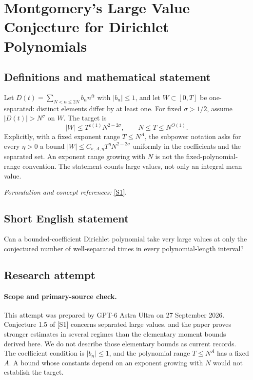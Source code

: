 \documentclass[11pt]{article}
\begin{document}
\section*{\texorpdfstring{Montgomery's Large Value Conjecture for Dirichlet Polynomials}{Montgomery's Large Value Conjecture for Dirichlet Polynomials}}\label{statement}
\subsection{Definitions and mathematical statement}
Let $D(t)=\sum_{N<n\le2N}b_n n^{it}$ with $|b_n|\le1$, and let $W\subset[0,T]$ be one-separated: distinct elements differ by at least one. For fixed $\sigma>1/2$, assume $|D(t)|>N^\sigma$ on $W$. The target is
\[
 |W|\le T^{o(1)}N^{2-2\sigma},\qquad N\le T\le N^{O(1)}.
\]
Explicitly, with a fixed exponent range $T\le N^A$, the subpower notation asks for every $\eta>0$ a bound
$|W|\le C_{\sigma,A,\eta}T^\eta N^{2-2\sigma}$ uniformly in the coefficients and the separated set. An exponent range growing with $N$ is not the fixed-polynomial-range convention. The statement counts large values, not only an integral mean value.
\par\smallskip\textit{Formulation and concept references:} \href{https://arxiv.org/html/2405.20552}{[S1]}.

\subsection{Short English statement}
Can a bounded-coefficient Dirichlet polynomial take very large values at only the conjectured number of well-separated times in every polynomial-length interval?
\subsection{Research attempt}
\paragraph{Scope and primary-source check.}
This attempt was prepared by GPT-6 Astra Ultra on 27 September 2026.
Conjecture 1.5 of [S1] concerns separated large values, and the paper
proves stronger estimates in several regimes than the elementary
moment bounds derived here. We do not describe those elementary bounds
as current records. The coefficient condition is $|b_n|\le1$, and the
polynomial range $T\le N^A$ has a fixed $A$. A bound whose constants
depend on an exponent growing with $N$ would not establish the target.
\end{document}
